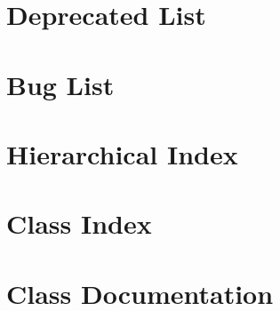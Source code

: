 \documentclass[twoside]{book}
\begin{document}
\chapter{Deprecated List}
\label{deprecated}
\hypertarget{deprecated}{}

\chapter{Bug List}
\label{bug}
\hypertarget{bug}{}

\chapter{Hierarchical Index}

\chapter{Class Index}

\chapter{Class Documentation}





































\newpage
{}
{}
\printindex
\end{document}
